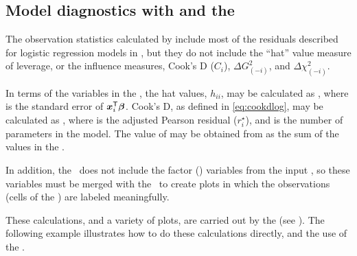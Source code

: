 \subsection{Model diagnostics with  and the }\label{loglin-inflglim}
The observation statistics calculated by 
include most of the residuals described for logistic regression models
in , but they do not include the ``hat'' value
measure of leverage, or the influence measures, Cook's D ($C_i$), $\Delta G_{(-i)}^2$, and $\Delta \chi_{(-i)}^2$.

In terms of the variables in the  \Dset, the hat values,
$h_{ii}$, may be calculated as ,
where  is the standard error of $\bm{x}_i^\mathsf{T} \bm{\beta}$.
Cook's D, as defined in \eqref{eq:cookdlog}, may be calculated as
, where  is
the adjusted Pearson residual ($r_i^{\star}$), and  is the
number of parameters in the model.  The value of  may be
obtained from  as the sum of the  values in
the  \Dset.

In addition, the  \Dset\ does not include the
factor () variables from the input \Dset,
so these variables must be merged with the  \Dset\ to
create plots in which the observations (cells of the \ctab)
are labeled meaningfully.

These calculations, and a variety of plots, are carried out by the
 (see ).  The following example
illustrates how to do these calculations directly, and the use of
the .





